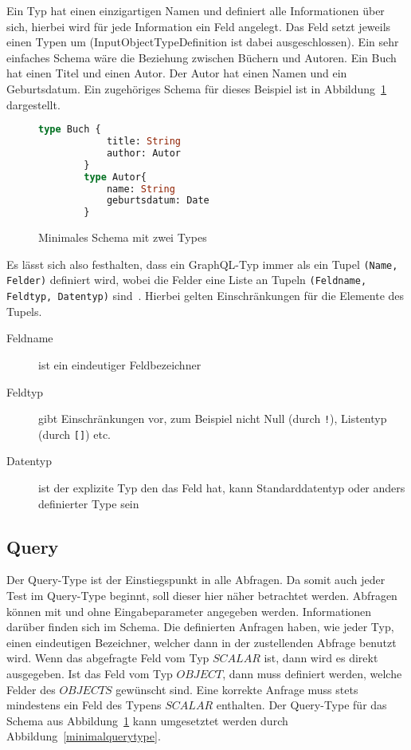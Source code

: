Ein Typ hat einen einzigartigen Namen und definiert alle Informationen über sich, hierbei wird für jede Information ein Feld angelegt.
Das Feld setzt jeweils einen Typen um (InputObjectTypeDefinition ist dabei ausgeschlossen).
Ein sehr einfaches Schema wäre die Beziehung zwischen Büchern und Autoren.
Ein Buch hat einen Titel und einen Autor.
Der Autor hat einen Namen und ein Geburtsdatum.
Ein zugehöriges Schema für dieses Beispiel ist in Abbildung~\ref{buchauthorschema} dargestellt.

\begin{figure}[htb]
    \begin{center}
        \begin{lstlisting}[language=GraphQL]
        type Buch {
            title: String
            author: Autor
        }
        type Autor{
            name: String
            geburtsdatum: Date
        }
        \end{lstlisting}
    \end{center}
    \caption{Minimales Schema mit zwei Types}
    \label{buchauthorschema}
\end{figure}

Es lässt sich also festhalten, dass ein GraphQL-Typ immer als ein Tupel \verb+(Name, Felder)+ definiert wird, wobei
die Felder eine Liste an Tupeln \verb+(Feldname, Feldtyp, Datentyp)+ sind~\cite[vgl. 3.6 Objects]{graphqlspecification}.
Hierbei gelten Einschränkungen für die Elemente des Tupels.

\begin{center}
    \begin{description}
        \item[Feldname] ist ein eindeutiger Feldbezeichner
        \item[Feldtyp] gibt Einschränkungen vor, zum Beispiel nicht Null (durch \verb+!+), Listentyp (durch \verb+[]+) etc.
        \item[Datentyp] ist der explizite Typ den das Feld hat, kann Standarddatentyp oder anders definierter Type sein
    \end{description}
\end{center}

\subsection{Query}

Der Query-Type ist der Einstiegspunkt in alle Abfragen.
Da somit auch jeder Test im Query-Type beginnt, soll dieser hier näher betrachtet werden.
Abfragen können mit und ohne Eingabeparameter angegeben werden.
Informationen darüber finden sich im Schema.
Die definierten Anfragen haben, wie jeder Typ, einen eindeutigen Bezeichner, welcher dann in der zustellenden Abfrage benutzt wird.
Wenn das abgefragte Feld vom Typ $SCALAR$ ist, dann wird es direkt ausgegeben.
Ist das Feld vom Typ $OBJECT$, dann muss definiert werden, welche Felder des $OBJECTS$ gewünscht sind.
Eine korrekte Anfrage muss stets mindestens ein Feld des Typens $SCALAR$ enthalten.
Der Query-Type für das Schema aus Abbildung~\ref{buchauthorschema} kann umgesetztet werden durch Abbildung~\ref{minimalquerytype}.

